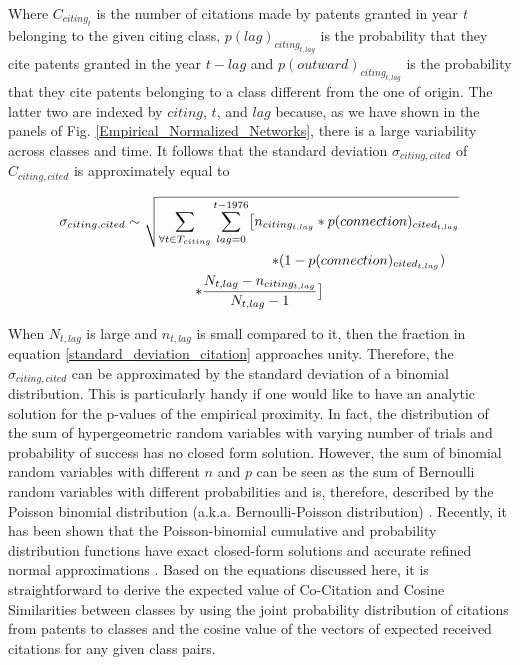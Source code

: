 \documentclass[]{svjour3}
\begin{document}
Where $C_{citing_{t}}$ is the number of citations made by patents granted in year \textit{t} belonging to the given citing class, $p(lag)_{citing_{t,lag}}$ is the probability that they cite patents granted in the year ${t-lag}$ and $p(outward)_{citing_{t,lag}}$ is the probability that they cite patents belonging to a class different from the one of origin. The latter two are indexed by $citing$, $t$, and $lag$ because, as we have shown in the panels of Fig. \ref{Empirical_Normalized_Networks}, there is a large variability across classes and time. It follows that the standard deviation $\sigma_{citing,cited}$ of ${C_{citing,cited}}$ is approximately equal to

\begin{multline}\label{standard_deviation_citation}
\sigma_{citing,cited} \sim 
\sqrt{ 
\sum_{\forall t \in T_{citing}}\sum_{lag=0}^{t-1976} \bigl[ n_{citing_{t,lag}} * p(connection)_{cited_{t,lag}}} \\
\shoveright{* (1-p(connection)_{cited_{t,lag}})} \\
* \frac{N_{t,lag}-n_{citing_{t,lag}}}{N_{t,lag}-1} \bigr]  
\end{multline}

When $N_{t,lag}$ is large and $n_{t,lag}$ is small compared to it, then the fraction in equation \ref{standard_deviation_citation} approaches unity. Therefore, the $\sigma_{citing,cited}$ can be approximated by the standard deviation of a binomial distribution. This is particularly handy if one would like to have an analytic solution for the p-values of the empirical proximity. In fact, the distribution of the sum of hypergeometric random variables with varying number of trials and probability of success has no closed form solution. However, the sum of binomial random variables with different $n$ and $p$ can be seen as the sum of Bernoulli random variables with different probabilities and is, therefore, described by the Poisson binomial distribution (a.k.a. Bernoulli-Poisson distribution) \citep{Hong2013, Fernandez2010, Chen1997}. Recently, it has been shown that the Poisson-binomial cumulative and probability distribution functions have exact closed-form solutions and accurate refined normal approximations \citep{Hong2013}. Based on the equations discussed here, it is straightforward to derive the expected value of Co-Citation and Cosine Similarities between classes by using the joint probability distribution of citations from patents to classes and the cosine value of the vectors of expected received citations for any given class pairs.
 
\end{document}
